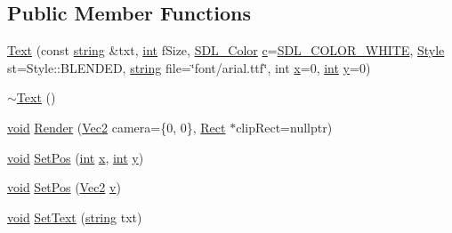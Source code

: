 \subsection*{Public Member Functions}
\begin{DoxyCompactItemize}
\item 
\hyperlink{class_text_a9291762a0deefcb919152c7b66ae448d}{Text} (const \hyperlink{_s_d_l__opengl__glext_8h_ae84541b4f3d8e1ea24ec0f466a8c568b}{string} \&txt, \hyperlink{_s_d_l__thread_8h_a6a64f9be4433e4de6e2f2f548cf3c08e}{int} f\-Size, \hyperlink{struct_s_d_l___color}{S\-D\-L\-\_\-\-Color} \hyperlink{_s_d_l__opengl__glext_8h_a1f2d7f8147412c43ba2303a56f97ee73}{c}=\hyperlink{common_8hpp_a8747c93cef1c9985be8fc426565f466e}{S\-D\-L\-\_\-\-C\-O\-L\-O\-R\-\_\-\-W\-H\-I\-T\-E}, \hyperlink{class_text_ac82ae440952fc1c8e10a16f81a593ce1}{Style} st=Style\-::\-B\-L\-E\-N\-D\-E\-D, \hyperlink{_s_d_l__opengl__glext_8h_ae84541b4f3d8e1ea24ec0f466a8c568b}{string} file=\char`\"{}font/arial.\-ttf\char`\"{}, int \hyperlink{_s_d_l__opengl_8h_ad0e63d0edcdbd3d79554076bf309fd47}{x}=0, \hyperlink{_s_d_l__thread_8h_a6a64f9be4433e4de6e2f2f548cf3c08e}{int} \hyperlink{_s_d_l__opengl_8h_a1675d9d7bb68e1657ff028643b4037e3}{y}=0)
\item 
\hyperlink{class_text_a2d49e5c280e205125b149f7777ae30c7}{$\sim$\-Text} ()
\item 
\hyperlink{_s_d_l__opengles2__gl2ext_8h_ae5d8fa23ad07c48bb609509eae494c95}{void} \hyperlink{class_text_a9eaf3c6d97df6f04451724287cf1b696}{Render} (\hyperlink{class_vec2}{Vec2} camera=\{0, 0\}, \hyperlink{class_rect}{Rect} $\ast$clip\-Rect=nullptr)
\item 
\hyperlink{_s_d_l__opengles2__gl2ext_8h_ae5d8fa23ad07c48bb609509eae494c95}{void} \hyperlink{class_text_a54e5a8deab134c5a94c6c3b074655c9f}{Set\-Pos} (\hyperlink{_s_d_l__thread_8h_a6a64f9be4433e4de6e2f2f548cf3c08e}{int} \hyperlink{_s_d_l__opengl_8h_ad0e63d0edcdbd3d79554076bf309fd47}{x}, \hyperlink{_s_d_l__thread_8h_a6a64f9be4433e4de6e2f2f548cf3c08e}{int} \hyperlink{_s_d_l__opengl_8h_a1675d9d7bb68e1657ff028643b4037e3}{y})
\item 
\hyperlink{_s_d_l__opengles2__gl2ext_8h_ae5d8fa23ad07c48bb609509eae494c95}{void} \hyperlink{class_text_a1d03c838f06ed656dde42843cd7b961c}{Set\-Pos} (\hyperlink{class_vec2}{Vec2} \hyperlink{_s_d_l__opengl_8h_a10a82eabcb59d2fcd74acee063775f90}{v})
\item 
\hyperlink{_s_d_l__opengles2__gl2ext_8h_ae5d8fa23ad07c48bb609509eae494c95}{void} \hyperlink{class_text_a300c34a38e7a01c5e5537391d13c1c78}{Set\-Text} (\hyperlink{_s_d_l__opengl__glext_8h_ae84541b4f3d8e1ea24ec0f466a8c568b}{string} txt)

\end{DoxyCompactItemize}
